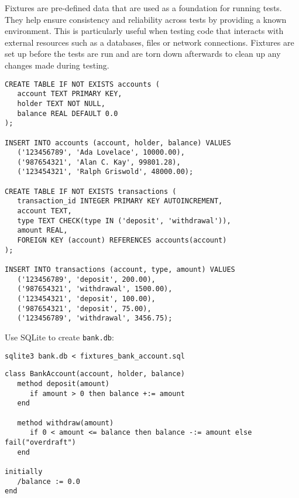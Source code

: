 \documentclass[letterpaper,12pt]{article}
\begin{document}
Fixtures are pre-defined data that are used as a foundation for running tests. They help ensure consistency and reliability across tests by providing a known environment. This is particularly useful when testing code that interacts with external resources such as a databases, files or network connections. Fixtures are set up before the tests are run and are torn down afterwards to clean up any changes made during testing.

\bigskip{}
\begin{verbatim}
CREATE TABLE IF NOT EXISTS accounts (
   account TEXT PRIMARY KEY,
   holder TEXT NOT NULL,
   balance REAL DEFAULT 0.0
);

INSERT INTO accounts (account, holder, balance) VALUES
   ('123456789', 'Ada Lovelace', 10000.00),
   ('987654321', 'Alan C. Kay', 99801.28),
   ('123454321', 'Ralph Griswold', 48000.00);

CREATE TABLE IF NOT EXISTS transactions (
   transaction_id INTEGER PRIMARY KEY AUTOINCREMENT,
   account TEXT,
   type TEXT CHECK(type IN ('deposit', 'withdrawal')),
   amount REAL,
   FOREIGN KEY (account) REFERENCES accounts(account)
);

INSERT INTO transactions (account, type, amount) VALUES
   ('123456789', 'deposit', 200.00),
   ('987654321', 'withdrawal', 1500.00),
   ('123454321', 'deposit', 100.00),
   ('987654321', 'deposit', 75.00),
   ('123456789', 'withdrawal', 3456.75);
\end{verbatim}

\noindent Use SQLite to create \texttt{bank.db}:
\begin{verbatim}
sqlite3 bank.db < fixtures_bank_account.sql
\end{verbatim}

\newpage\bigskip{}
\begin{verbatim}
class BankAccount(account, holder, balance)
   method deposit(amount)
      if amount > 0 then balance +:= amount
   end

   method withdraw(amount)
      if 0 < amount <= balance then balance -:= amount else fail("overdraft")
   end

initially
   /balance := 0.0
end
\end{verbatim}
\end{document}
